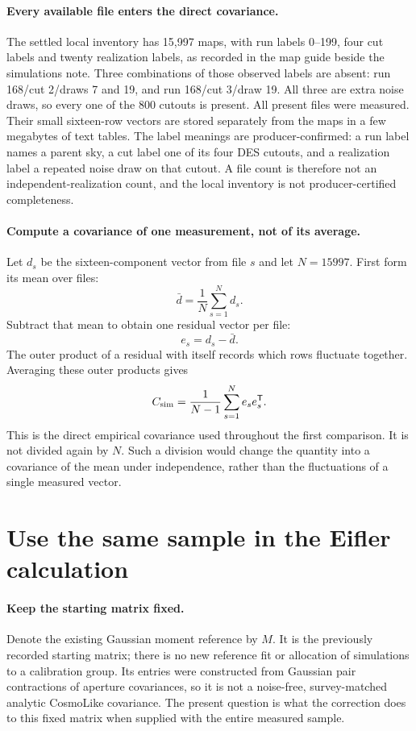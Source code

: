 \documentclass[11pt]{article}
\begin{document}
\paragraph{Every available file enters the direct covariance.}
The settled local inventory has 15,997 maps, with run labels 0--199,
four cut labels and twenty realization labels, as recorded in the map guide
beside the simulations note. Three combinations of those observed labels are
absent: run 168/cut 2/draws 7 and 19, and run 168/cut 3/draw 19. All three
are extra noise draws, so every one of the 800 cutouts is present. All
present files were measured. Their small sixteen-row vectors are stored
separately from the maps in a few megabytes of text tables. The label
meanings are producer-confirmed: a run label names a parent sky, a cut
label one of its four DES cutouts, and a realization label a repeated
noise draw on that cutout. A file count is therefore not an
independent-realization count, and the local inventory is not
producer-certified completeness.

\paragraph{Compute a covariance of one measurement, not of its average.}
Let $d_s$ be the sixteen-component vector from file $s$ and let
$N=15997$. First form its mean over files:
\begin{equation}
 \bar d=\frac{1}{N}\sum_{s=1}^{N}d_s.
\end{equation}
Subtract that mean to obtain one residual vector per file:
\begin{equation}
 e_s=d_s-\bar d.
\end{equation}
The outer product of a residual with itself records which rows fluctuate
together. Averaging these outer products gives
\begin{equation}
 C_{\rm sim}=\frac{1}{N-1}\sum_{s=1}^{N}e_s e_s^{\mathsf T}.
 \label{eq:sample}
\end{equation}
This is the direct empirical covariance used throughout the first
comparison. It is not divided again by $N$. Such a division would change
the quantity into a covariance of the mean under independence, rather
than the fluctuations of a single measured vector.

\section{Use the same sample in the Eifler calculation}
\paragraph{Keep the starting matrix fixed.}
Denote the existing Gaussian moment reference by $M$. It is the previously
recorded starting matrix; there is no new reference fit or allocation of
simulations to a calibration group. Its entries were constructed from
Gaussian pair contractions of aperture covariances, so it is not a
noise-free, survey-matched analytic CosmoLike covariance. The present
question is what the correction does to this fixed matrix when supplied
with the entire measured sample.
\end{document}
